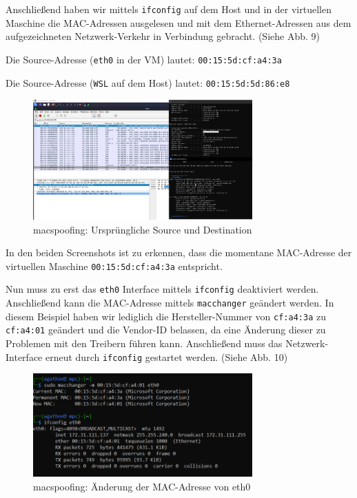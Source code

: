 \documentclass{article}
\begin{document}
Anschließend haben wir mittels \texttt{ifconfig} auf dem Host und in der virtuellen Maschine
die MAC-Adressen ausgelesen und mit dem Ethernet-Adressen aus dem aufgezeichneten Netzwerk-Verkehr
in Verbindung gebracht. (Siehe Abb. 9)

Die Source-Adresse (\texttt{eth0} in der VM) lautet: \texttt{00:15:5d:cf:a4:3a}

Die Source-Adresse (\texttt{WSL} auf dem Host) lautet: \texttt{00:15:5d:5d:86:e8}

\begin{figure}[H]
	\includegraphics[width=0.75\textwidth]{images/09}
	\centering
	\caption{macspoofing: Ursprüngliche Source und Destination}
\end{figure}

In den beiden Screenshots ist zu erkennen, dass die momentane MAC-Adresse der virtuellen
Maschine \texttt{00:15:5d:cf:a4:3a} entspricht.

Nun muss zu erst das \texttt{eth0} Interface mittels \texttt{ifconfig} deaktiviert werden. 
Anschließend kann die MAC-Adresse mittels \texttt{macchanger} geändert werden. In diesem 
Beispiel haben wir lediglich die Hersteller-Nummer von \texttt{cf:a4:3a} zu \texttt{cf:a4:01}
geändert und die Vendor-ID belassen, da eine Änderung dieser zu Problemen mit den Treibern
führen kann. Anschließend muss das Netzwerk-Interface erneut durch \texttt{ifconfig} gestartet werden.
(Siehe Abb. 10)

\begin{figure}[H]
	\includegraphics[width=0.75\textwidth]{images/10}
	\centering
	\caption{macspoofing: Änderung der MAC-Adresse von eth0}
\end{figure}
\end{document}
